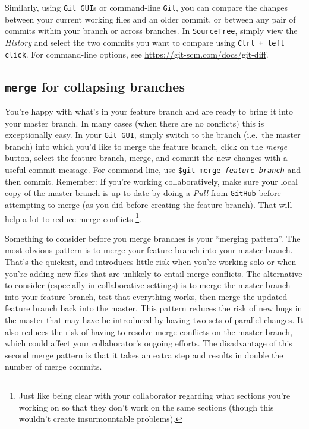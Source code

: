 \documentclass[12pt,letterpaper]{article}
\begin{document}
Similarly, using \texttt{Git GUI}s or command-line \texttt{Git}, you can compare 
the changes between your current working files and an older commit, 
or between any pair of commits within your branch or across branches.
In \texttt{SourceTree}, simply view the \emph{History} and select the two commits you want to compare using \texttt{Ctrl + left click}.
For command-line options, see \url{https://git-scm.com/docs/git-diff}.


\subsection{\texttt{merge} for collapsing branches}

You're happy with what's in your feature branch and are ready to bring it into your master branch.
In many cases (when there are no conflicts) this is exceptionally easy.
In your \texttt{Git GUI}, simply switch to the branch (i.e.~the master branch) into 
which you'd like to merge the feature branch, 
click on the \emph{merge} button, 
select the feature branch, 
merge, and commit the new changes with a useful commit message.
For command-line, 
use \texttt{\$git merge \emph{feature branch}} and then commit.
Remember:  If you're working collaboratively, make sure your local copy of the master branch is up-to-date by doing a \emph{Pull} from \texttt{GitHub} before attempting to merge (as you did before creating the feature branch).
That will help a lot to reduce merge conflicts
\unskip
\footnote{Just like being clear with your collaborator regarding what sections
	 you're working on so that they don't work on the same sections
	 (though this wouldn't create insurmountable problems).}.

Something to consider before you merge branches is your ``merging pattern''.
The most obvious pattern is to merge your feature branch into your master branch.
That's the quickest, and introduces little risk when you're working solo or when you're adding new files that are unlikely to entail merge conflicts.
The alternative to consider (especially in collaborative settings) is to merge the 
master branch into your feature branch, test that everything works, 
then merge the updated feature branch back into the master.
This pattern reduces the risk of new bugs in the master that may have be introduced by having two sets of parallel changes.
It also reduces the risk of having to resolve merge conflicts on the master branch, which could affect your collaborator's ongoing efforts.
The disadvantage of this second merge pattern is that it takes an extra step and results in double the number of merge commits.
\end{document}
